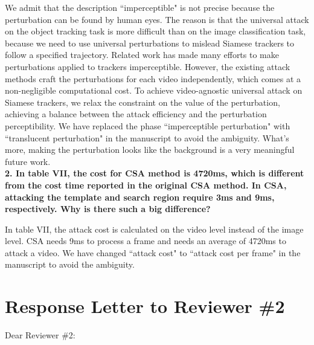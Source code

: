 \documentclass[12pt]{article}
\begin{document}
We admit that the description “imperceptible" is not precise because the perturbation can be found by human eyes. The reason is that the universal attack on the object tracking task is more difficult than on the image classification task, because we need to use universal perturbations to mislead Siamese trackers to follow a specified trajectory.
Related work \cite{SPARK, CSA} has made many efforts to make perturbations applied to trackers imperceptible. However, the existing attack methods craft the perturbations for each video independently, which comes at a non-negligible computational cost. To achieve video-agnostic universal attack on Siamese trackers, we relax the constraint on the value of the perturbation, achieving a balance between the attack efficiency and the perturbation perceptibility.
We have replaced the phase ``imperceptible perturbation" with ``translucent perturbation" \cite{zolfi2021translucent} in the manuscript to avoid the ambiguity.
What's more, making the perturbation looks like the background is a very meaningful future work.
\\[6pt]
\noindent \textbf{2. In table VII, the cost for CSA method is 4720ms, which is different from the cost time reported in the original CSA method. In CSA, attacking the template and search region require 3ms and 9ms, respectively. Why is there such a big difference?}

In table VII, the attack cost is calculated on the video level instead of the image level. CSA needs 9ms to process a frame and needs an average of 4720ms to attack a video. We have changed ``attack cost" to ``attack cost per frame" in the manuscript to avoid the ambiguity.

\newpage
{\centering\section*{Response Letter to Reviewer \#2}}
\noindent Dear Reviewer \#2:
\end{document}
